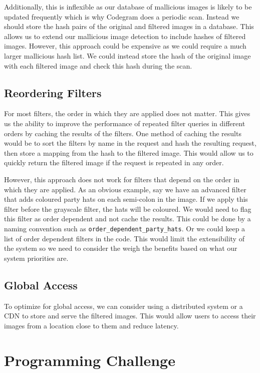 \documentclass{csse4400}
\begin{document}
Additionally, this is inflexible as our database of mallicious images is likely to be updated frequently which is why Codegram does a periodic scan.
Instead we should store the hash pairs of the original and filtered images in a database.
This allows us to extend our mallicious image detection to include hashes of filtered images.
However, this approach could be expensive as we could require a much larger mallicious hash list.
We could instead store the hash of the original image with each filtered image and check this hash during the scan.

\subsection{Reordering Filters}
For most filters, the order in which they are applied does not matter.
This gives us the ability to improve the performance of repeated filter queries in different orders by caching the results of the filters.
One method of caching the results would be to sort the filters by name in the request and hash the resulting request,
then store a mapping from the hash to the filtered image.
This would allow us to quickly return the filtered image if the request is repeated in any order.

However, this approach does not work for filters that depend on the order in which they are applied.
As an obvious example, say we have an advanced filter that adds coloured party hats on each semi-colon in the image.
If we apply this filter before the grayscale filter, the hats will be coloured.
We would need to flag this filter as order dependent and not cache the results.
This could be done by a naming convention such as \texttt{order\_dependent\_party\_hats}.
Or we could keep a list of order dependent filters in the code.
This would limit the extensibility of the system so we need to consider the weigh the benefits based on what our system priorities are.


\subsection{Global Access}
To optimize for global access,
we can consider using a distributed system or a CDN to store and serve the filtered images.
This would allow users to access their images from a location close to them and reduce latency.

\section{Programming Challenge}
\end{document}
